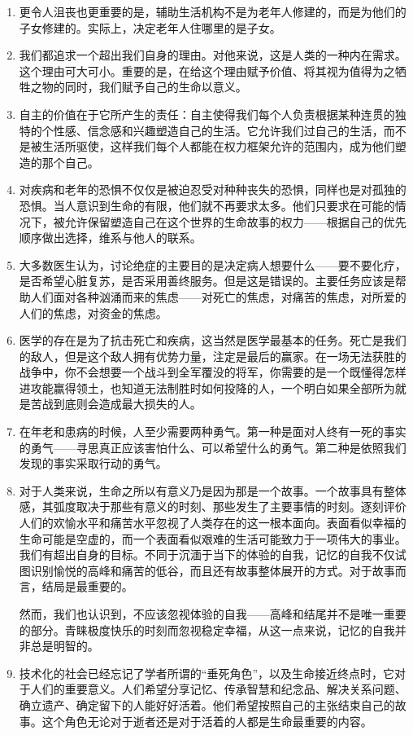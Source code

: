 \documentclass[UTF8]{ctexart}
\begin{document}
\begin{enumerate}
			\item 更令人沮丧也更重要的是，辅助生活机构不是为老年人修建的，而是为他们的子女修建的。实际上，决定老年人住哪里的是子女。
			
			\item 我们都追求一个超出我们自身的理由。对他来说，这是人类的一种内在需求。这个理由可大可小。重要的是，在给这个理由赋予价值、将其视为值得为之牺牲之物的同时，我们赋予自己的生命以意义。
			
			\item 自主的价值在于它所产生的责任：自主使得我们每个人负责根据某种连贯的独特的个性感、信念感和兴趣塑造自己的生活。它允许我们过自己的生活，而不是被生活所驱使，这样我们每个人都能在权力框架允许的范围内，成为他们塑造的那个自己。
			
			\item 对疾病和老年的恐惧不仅仅是被迫忍受对种种丧失的恐惧，同样也是对孤独的恐惧。当人意识到生命的有限，他们就不再要求太多。他们只要求在可能的情况下，被允许保留塑造自己在这个世界的生命故事的权力——根据自己的优先顺序做出选择，维系与他人的联系。
			
			\item 大多数医生认为，讨论绝症的主要目的是决定病人想要什么——要不要化疗，是否希望心脏复苏，是否采用善终服务。但是这是错误的。主要任务应该是帮助人们面对各种汹涌而来的焦虑——对死亡的焦虑，对痛苦的焦虑，对所爱的人们的焦虑，对资金的焦虑。
			
			\item  医学的存在是为了抗击死亡和疾病，这当然是医学最基本的任务。死亡是我们的敌人，但是这个敌人拥有优势力量，注定是最后的赢家。在一场无法获胜的战争中，你不会想要一个战斗到全军覆没的将军，你需要的是一个既懂得怎样进攻能赢得领土，也知道无法制胜时如何投降的人，一个明白如果全部所为就是苦战到底则会造成最大损失的人。
			
			\item 在年老和患病的时候，人至少需要两种勇气。第一种是面对人终有一死的事实的勇气——寻思真正应该害怕什么、可以希望什么的勇气。第二种是依照我们发现的事实采取行动的勇气。
			
			\item 对于人类来说，生命之所以有意义乃是因为那是一个故事。一个故事具有整体感，其弧度取决于那些有意义的时刻、那些发生了主要事情的时刻。逐刻评价人们的欢愉水平和痛苦水平忽视了人类存在的这一根本面向。表面看似幸福的生命可能是空虚的，而一个表面看似艰难的生活可能致力于一项伟大的事业。我们有超出自身的目标。不同于沉湎于当下的体验的自我，记忆的自我不仅试图识别愉悦的高峰和痛苦的低谷，而且还有故事整体展开的方式。对于故事而言，结局是最重要的。
			
			然而，我们也认识到，不应该忽视体验的自我——高峰和结尾并不是唯一重要的部分。青睐极度快乐的时刻而忽视稳定幸福，从这一点来说，记忆的自我并非总是明智的。
			
			\item 技术化的社会已经忘记了学者所谓的“垂死角色”，以及生命接近终点时，它对于人们的重要意义。人们希望分享记忆、传承智慧和纪念品、解决关系问题、确立遗产、确定留下的人能好好活着。他们希望按照自己的主张结束自己的故事。这个角色无论对于逝者还是对于活着的人都是生命最重要的内容。
			
		\end{enumerate}
	
\end{document}
